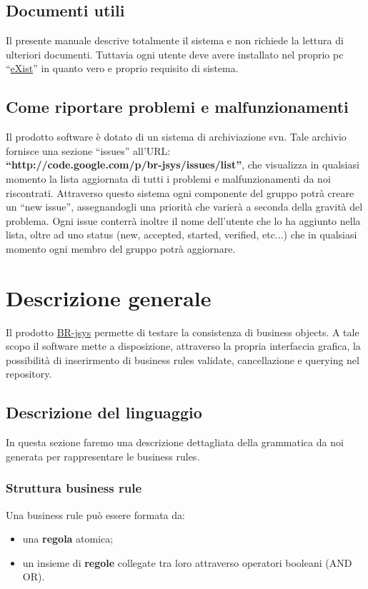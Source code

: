 \section{Documenti utili}
Il presente manuale descrive totalmente il sistema e non richiede la lettura di ulteriori documenti. Tuttavia ogni utente deve avere installato nel proprio pc ``\underline{eXist}'' in quanto vero e proprio requisito di sistema. 
\section{Come riportare problemi e malfunzionamenti}
Il prodotto software \`e dotato di un sistema di archiviazione svn. Tale archivio fornisce una sezione ``issues'' all'URL: \\ 
\textbf{``http://code.google.com/p/br-jsys/issues/list''}, che visualizza in qualsiasi momento la lista aggiornata di tutti i problemi e malfunzionamenti da noi riscontrati. Attraverso questo sistema ogni componente del gruppo potr\`a creare un ``new issue'', assegnandogli una priorit\`a che varier\`a a seconda della gravit\`a del problema. Ogni issue conterr\`a inoltre il nome dell'utente che lo ha aggiunto nella lista, oltre ad uno status (new, accepted, started, verified, etc...) che in qualsiasi momento ogni membro del gruppo potr\`a aggiornare. 

\chapter{Descrizione generale}
Il prodotto \underline{BR-jsys} permette di testare la consistenza di business objects. A tale scopo il software mette a disposizione, attraverso la propria interfaccia grafica, la possibilit\`a di inserirmento di business rules validate, cancellazione e querying nel repository.
\section{Descrizione del linguaggio}
In questa sezione faremo una descrizione dettagliata della grammatica da noi generata per rappresentare le business rules. 
\subsection{Struttura business rule}
Una business rule pu\`o essere formata da:
\begin{itemize}
\item una \textbf{regola} atomica;
\item un insieme di \textbf{regole} collegate tra loro attraverso operatori booleani (AND \textbar OR).
\end{itemize}
